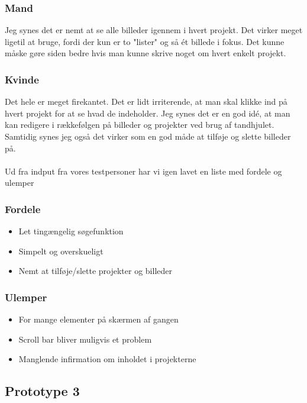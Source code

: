 \documentclass[a4paper,titlepage,fleqn,12pt]{article}
\begin{document}
\subsubsection{Mand}
Jeg synes det er nemt at se alle billeder igennem i hvert projekt. Det virker meget ligetil at bruge, fordi der kun er to "lister" og så ét billede i fokus. Det kunne måske gøre siden bedre hvis man kunne skrive noget om hvert enkelt projekt.

\subsubsection{Kvinde}
Det hele er meget firekantet. Det er lidt irriterende, at man skal klikke ind på hvert projekt for at se hvad de indeholder. Jeg synes det er en god idé, at man kan redigere i rækkefølgen på billeder og projekter ved brug af tandhjulet. Samtidig synes jeg også det virker som en god måde at tilføje og slette billeder på.\\\\
Ud fra indput fra vores testpersoner har vi igen lavet en liste med fordele og ulemper


\subsubsection{Fordele}
\begin{itemize}
	\item Let tingængelig søgefunktion
	\item Simpelt og overskueligt
	\item Nemt at tilføje/slette projekter og billeder
\end{itemize}

\subsubsection{Ulemper}
\begin{itemize}
	\item For mange elementer på skærmen af gangen
	\item Scroll bar bliver muligvis et problem
	\item Manglende infirmation om inholdet i projekterne
\end{itemize}

\subsection{Prototype 3}
\end{document}
